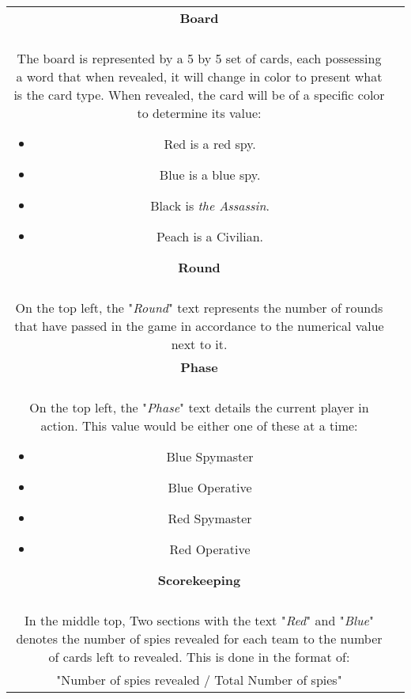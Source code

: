 \documentclass[10pt, a4paper]{article}
\begin{document}
\begin{table}[htbp]
\begin{center}
\begin{tabular}{| c | c |}
	
		\textbf{Board}\\
		\\
		The board is represented by a 5 by 5 set of cards, each possessing a word that when revealed, it will change in color to present what is the card type. When revealed, the card will be of a specific color to determine its value:  
		    \begin{itemize}
		        \item Red is a red spy.
		        \item Blue is a blue spy.
		        \item Black is \textit{the Assassin}.
		        \item Peach is a Civilian.
		    \end{itemize}
		    
	    \textbf{Round}\\
	    \\
	    On the top left, the "\textit{Round}" text represents the number of rounds that have passed in the game in accordance to the numerical value next to it.\\
	    
	    \textbf{Phase}\\
	    \\
	    On the top left, the "\textit{Phase}" text details the current player in action. This value would be either one of these at a time:
	        \begin{itemize}
	            \item Blue Spymaster
	            \item Blue Operative
	            \item Red Spymaster
	            \item Red Operative
	        \end{itemize}
	   
	   \textbf{Scorekeeping}\\
	   \\
	   In the middle top, Two sections with the text "\textit{Red}" and "\textit{Blue}" denotes the number of spies revealed for each team to the number of cards left to revealed. This is done in the format of:\\
	   
	   "Number of spies revealed / Total Number of spies"\\
	   

\end{tabular}
\end{center}
\end{table}
\end{document}
